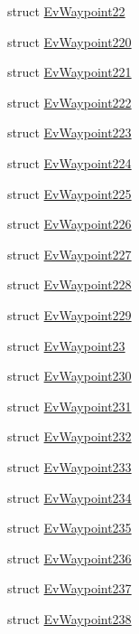 \begin{DoxyCompactItemize}
struct \hyperlink{structmove__base__z__client_1_1EvWaypoint22}{Ev\+Waypoint22}
\item 
struct \hyperlink{structmove__base__z__client_1_1EvWaypoint220}{Ev\+Waypoint220}
\item 
struct \hyperlink{structmove__base__z__client_1_1EvWaypoint221}{Ev\+Waypoint221}
\item 
struct \hyperlink{structmove__base__z__client_1_1EvWaypoint222}{Ev\+Waypoint222}
\item 
struct \hyperlink{structmove__base__z__client_1_1EvWaypoint223}{Ev\+Waypoint223}
\item 
struct \hyperlink{structmove__base__z__client_1_1EvWaypoint224}{Ev\+Waypoint224}
\item 
struct \hyperlink{structmove__base__z__client_1_1EvWaypoint225}{Ev\+Waypoint225}
\item 
struct \hyperlink{structmove__base__z__client_1_1EvWaypoint226}{Ev\+Waypoint226}
\item 
struct \hyperlink{structmove__base__z__client_1_1EvWaypoint227}{Ev\+Waypoint227}
\item 
struct \hyperlink{structmove__base__z__client_1_1EvWaypoint228}{Ev\+Waypoint228}
\item 
struct \hyperlink{structmove__base__z__client_1_1EvWaypoint229}{Ev\+Waypoint229}
\item 
struct \hyperlink{structmove__base__z__client_1_1EvWaypoint23}{Ev\+Waypoint23}
\item 
struct \hyperlink{structmove__base__z__client_1_1EvWaypoint230}{Ev\+Waypoint230}
\item 
struct \hyperlink{structmove__base__z__client_1_1EvWaypoint231}{Ev\+Waypoint231}
\item 
struct \hyperlink{structmove__base__z__client_1_1EvWaypoint232}{Ev\+Waypoint232}
\item 
struct \hyperlink{structmove__base__z__client_1_1EvWaypoint233}{Ev\+Waypoint233}
\item 
struct \hyperlink{structmove__base__z__client_1_1EvWaypoint234}{Ev\+Waypoint234}
\item 
struct \hyperlink{structmove__base__z__client_1_1EvWaypoint235}{Ev\+Waypoint235}
\item 
struct \hyperlink{structmove__base__z__client_1_1EvWaypoint236}{Ev\+Waypoint236}
\item 
struct \hyperlink{structmove__base__z__client_1_1EvWaypoint237}{Ev\+Waypoint237}
\item 
struct \hyperlink{structmove__base__z__client_1_1EvWaypoint238}{Ev\+Waypoint238}

\end{DoxyCompactItemize}
